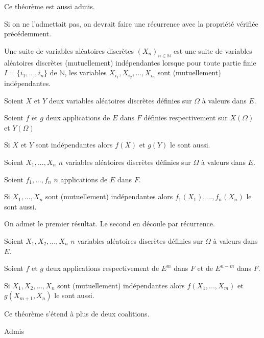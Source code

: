 \documentclass[a4paper,12pt]{book}
\newcommand{\Def}[2]{\begin{tcolorbox}[sharp corners, colback=white,colframe=blue!90!black!75, title=Définition : #1]#2\end{tcolorbox}}
\newcommand{\Prop}[2]{\begin{tcolorbox}[sharp corners, colback=white,colframe=red!90!black!75, title=Proposition : #1]#2\end{tcolorbox}}
\newcommand{\Pre}[1]{\begin{tcolorbox}[sharp corners, colback=white,colframe=green!60!green!30!black!75, title=Preuve]#1\end{tcolorbox}}
\def\N{\mathbb{N}}
\begin{document}
\Pre{Ce théorème est aussi admis.
\par Si on ne l'admettait pas, on devrait faire une récurrence avec la propriété vérifiée précédemment.}
\Def{}{Une suite de variables aléatoires discrètes $(X_n)_{n\in\N}$ est une suite de variables aléatoires discrètes (mutuellement) indépendantes lorsque pour toute partie finie $I = \{i_1,...,i_n\}$ de $\N$, les variables $X_{i_1}, X_{i_2},..., X_{i_n}$ sont (mutuellement) indépendantes.}
\Prop{}{Soient $X$ et $Y$ deux variables aléatoires discrètes définies sur $\Omega$ à valeurs dans $E$.
\par Soient $f$ et $g$ deux applications de $E$ dans $F$ définies respectivement sur $X(\Omega)$ et $Y(\Omega)$
\par Si $X$ et $Y$ sont indépendantes alors $f(X)$ et $g(Y)$ le sont aussi.}
\Prop{}{Soient $X_1,..., X_n$ $n$ variables aléatoires discrètes définies sur $\Omega$ à valeurs dans $E$.
\par Soient $f_1,...,f_n$ $n$ applications de $E$ dans $F$.
\par Si $X_1,...,X_n$ sont (mutuellement) indépendantes alors $f_1(X_1),..., f_n(X_n)$ le sont aussi.}
\Pre{On admet le premier résultat. Le second en découle par récurrence.}
\Prop{Lemme des coalitions}{Soient $X_1,X_2,...,X_n$ $n$ variables aléatoires discrètes définies sur $\Omega$ à valeurs dans $E$.
\par Soient $f$ et $g$ deux applications respectivement de $E^m$ dans $F$ et de $E^{n-m}$ dans $F$.
\par Si $X_1,X_2,..., X_n$ sont (mutuellement) indépendantes alors $f(X_1,..., X_m)$ et $g(X_{m+1}, X_n)$ le sont aussi.
\par Ce théorème s'étend à plus de deux coalitions.}
\Pre{Admis}
\end{document}

